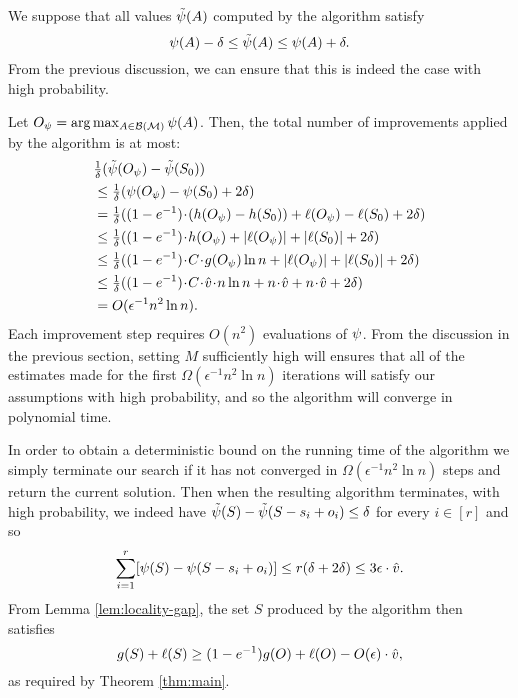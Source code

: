 \documentclass{article}
\theoremstyle{definition}
\begin{document}
We suppose that all values $\tilde{\psi}(A)$ computed by the algorithm satisfy
\[\psi(A) - \delta \le \tilde{\psi}(A) \le \psi(A) + \delta.\]  From the previous discussion, we can ensure that this is indeed the case with high probability.

Let $O_{\psi} = \arg\max_{A \in \mathcal{B}(\mathcal{M})}\psi(A)$.  Then, the total number of improvements applied by the algorithm is at most:
\begin{align*}
&{\textstyle \frac{1}{\delta}}(\potEst(O_{\pot}) - \potEst(\sinit)) \\
&\le {\textstyle \frac{1}{\delta}}(\pot(O_{\pot}) - \pot(\sinit) + 2\delta)
\\ &= {\textstyle \frac{1}{\delta}}((1 - e^{-1})\!\cdot\!(\NOsubmod(O_{\pot}) - \NOsubmod(\sinit)) + \lin(O_{\pot}) - \lin(\sinit)  + 2\delta)
\\ &\le {\textstyle \frac{1}{\delta}}((1 - e^{-1})\!\cdot\!\NOsubmod(O_{\pot}) + |\lin(O_{\pot})| + |\lin(\sinit)| + 2\delta)
\\ &\le {\textstyle \frac{1}{\delta}}((1 - e^{-1})\!\cdot\!C\!\cdot\!\submod(O_{\pot})\ln n + |\lin(O_{\pot})| + |\lin(\sinit)| + 2\delta)
\\ &\le {\textstyle \frac{1}{\delta}}((1 - e^{-1})\!\cdot\!C\!\cdot\!\vmax\!\cdot\!n \ln n + n\!\cdot\!\vmax + n\!\cdot\!\vmax + 2\delta)
\\ &= O(\epsilon^{-1}n^{2}\ln n).
\end{align*}
Each improvement step requires $O(n^{2})$ evaluations of $\psi$.  From the discussion in the previous section, setting $M$ sufficiently high will ensures that all of the estimates made for the first $\Omega(\epsilon^{-1}n^{2}\ln n)$ iterations will satisfy our assumptions with high probability, and so the algorithm will converge in polynomial time.  

In order to obtain a deterministic bound on the running time of the algorithm we simply terminate our search if it has not converged in $\Omega(\epsilon^{-1}n^{2}\ln n)$ steps and return the current solution.  Then when the resulting algorithm terminates, with high probability, we indeed have $\tilde{\psi}(S) - \tilde{\psi}(S - s_{i} + o_{i}) \le \delta$ for every $i \in [r]$ and so
 \begin{equation*} 
\sum_{i = 1}^{r}[\psi(S) - \psi(S - s_{i} + o_{i})] \le r(\delta + 2\delta) \le 3\epsilon \cdot \hat{v}.
\end{equation*}
From Lemma \ref{lem:locality-gap}, the set $S$ produced by the algorithm then satisfies
\[
g(S) + \ell(S) \ge (1 - e^{-1})g(O) + \ell(O) - O(\epsilon) \cdot \hat{v},
\]
as required by Theorem \ref{thm:main}.
\end{document}
